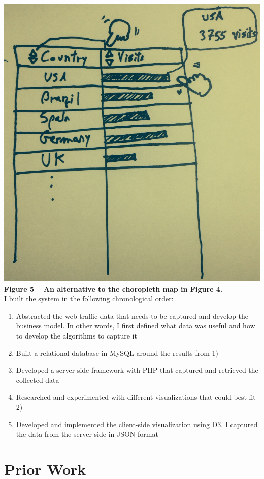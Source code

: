 \documentclass[12pt]{article}
\begin{document}
\noindent\includegraphics[scale=0.3]{img/table}
\noindent\textbf{Figure 5 -- An alternative to the choropleth map in Figure 4.} \\

I built the system in the following chronological order:
\begin{enumerate}
\item Abstracted the web traffic data that needs to be captured and develop the business model. In other words, I first defined what data was useful and how to develop the algorithms to capture it
\item Built a relational database in MySQL around the results from 1)
\item Developed a server-side framework with PHP that captured and retrieved the collected data
\item Researched and experimented with different visualizations that could best fit 2)
\item Developed and implemented the client-side visualization using D3. I captured the data from the server side in JSON format
\end{enumerate}

\vfill

\section{Prior Work}
\end{document}
